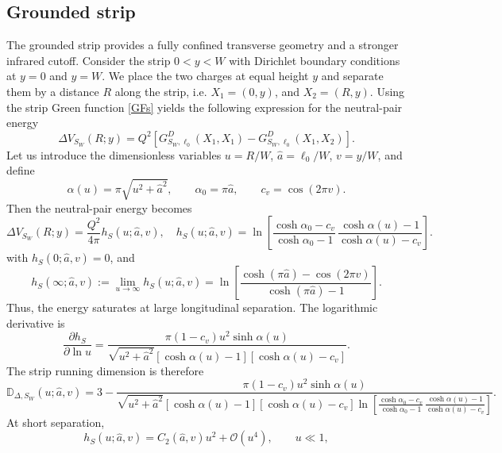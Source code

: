 \documentclass[nopacs,amsmath,amsfonts,amssymb,aps,superscriptaddress]{revtex4}
\begin{document}
\subsection{Grounded strip}
\label{subsec:running_dimension_strip}

The grounded strip provides a fully confined transverse geometry and a stronger infrared cutoff. Consider the strip $0<y<W$ with Dirichlet boundary conditions at $y=0$ and $y=W$. We place the two charges at equal height $y$ and separate them by a distance $R$ along the strip, i.e. $X_1=(0,y)$, and $X_2=(R,y)$. Using the strip Green function \eqref{GFs} yields the following expression for the neutral-pair energy
\begin{equation}
  \Delta V_{S_W}(R;y)=Q^2\left[G_{S_W,\ell_0}^D(X_1,X_1)-G_{S_W,\ell_0}^D(X_1,X_2)\right].
\end{equation}
Let us introduce the dimensionless variables $u=R/W$, $\widehat{a}=\ell_0/W$, $v=y/W$, and define
\begin{equation}
  \alpha(u) = \pi\sqrt{u^2+\widehat{a}^2}, \qquad \alpha_0 = \pi \widehat{a},\qquad c_v = \cos(2\pi v).
\end{equation}
Then the neutral-pair energy becomes
\begin{equation}
  \Delta V_{S_W}(R;y)=\frac{Q^2}{4\pi}h_S(u;\widehat{a},v),\quad h_S(u;\widehat{a},v)=\ln\left[\frac{\cosh\alpha_0-c_v}{\cosh\alpha_0-1}\,\frac{\cosh\alpha(u)-1}{\cosh\alpha(u)-c_v}\right].
\end{equation}
with $h_S(0;\widehat{a},v)=0$, and
\begin{equation}
  h_S(\infty;\widehat{a},v):=\lim_{u\to\infty}h_S(u;\widehat{a},v)=\ln\left[\frac{\cosh(\pi \widehat{a})-\cos(2\pi v)}{\cosh(\pi \widehat{a})-1}\right].
\end{equation}
Thus, the energy saturates at large longitudinal separation. The logarithmic derivative is
\begin{equation}
  \frac{\partial h_S}{\partial\ln u}=\frac{\pi(1-c_v)u^2\sinh\alpha(u)}{\sqrt{u^2+\widehat{a}^2}[\cosh\alpha(u)-1][\cosh\alpha(u)-c_v]}.
\end{equation}
The strip running dimension is therefore
\begin{equation}
\mathbb D_{\Delta,S_W}(u;\widehat{a},v)=3-\frac{\pi(1-c_v)u^2\sinh\alpha(u)}{\sqrt{u^2+\widehat{a}^2}[\cosh\alpha(u)-1][\cosh\alpha(u)-c_v]\ln\left[\frac{\cosh\alpha_0-c_v}{\cosh\alpha_0-1}
\,\frac{\cosh\alpha(u)-1}{\cosh\alpha(u)-c_v}\right]}.
\end{equation}
At short separation,
\begin{equation}
h_S(u;\widehat{a},v)=C_2(\widehat{a},v)u^2+\mathcal{O}(u^4),\qquad u\ll1,
\end{equation}
\end{document}

